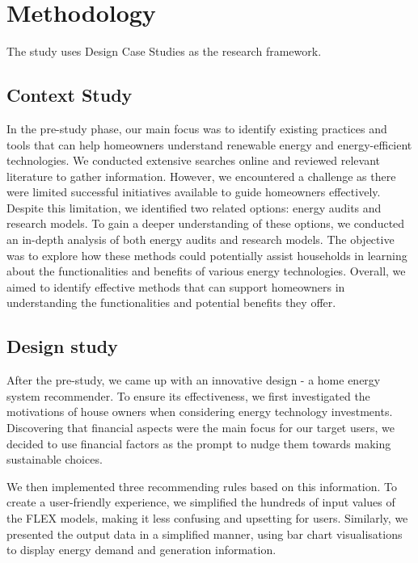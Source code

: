 \chapter{Methodology} 

The study uses Design Case Studies \cite{dcs} as the research framework. 


\section{Context Study}

In the pre-study phase, 
our main focus was to identify existing practices and tools that can help homeowners understand renewable energy and energy-efficient technologies.
We conducted extensive searches online and reviewed relevant literature to gather information. 
However, we encountered a challenge as there were limited successful initiatives available to guide homeowners effectively.
Despite this limitation, we identified two related options: energy audits and research models. 
To gain a deeper understanding of these options, we conducted an in-depth analysis of both energy audits and research models. 
The objective was to explore how these methods could potentially assist households in learning about the functionalities and benefits of various energy technologies.
Overall, we aimed to identify effective methods that can support homeowners in understanding the functionalities and potential benefits they offer.


\section{Design study}

After the pre-study, we came up with an innovative design - a home energy system recommender. 
To ensure its effectiveness, we first investigated the motivations of house owners when considering energy technology investments. 
Discovering that financial aspects were the main focus for our target users, we decided to use financial factors as the prompt to nudge them towards making sustainable choices.

We then implemented three recommending rules based on this information. 
To create a user-friendly experience, we simplified the hundreds of input values of the FLEX models, making it less confusing and upsetting for users. 
Similarly, we presented the output data in a simplified manner, using bar chart visualisations to display energy demand and generation information.


